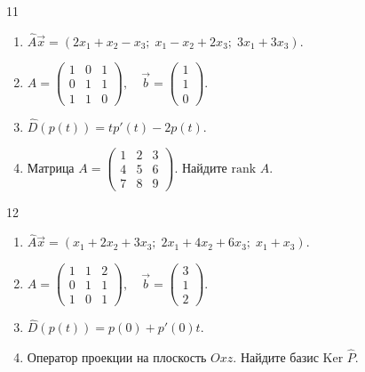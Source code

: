 \documentclass[12pt,a4paper]{article}
\theoremstyle{plain}
\theoremstyle{definition}
\begin{document}
\begin{taskbox}{11}
    \begin{enumerate}
        \item $\hat{A}\vec{x} = (2x_1 + x_2 - x_3; \; x_1 - x_2 + 2x_3; \; 3x_1 + 3x_3)$.
        \item $A = \begin{pmatrix} 1 & 0 & 1 \\ 0 & 1 & 1 \\ 1 & 1 & 0 \end{pmatrix}, \quad \vec{b} = \begin{pmatrix} 1 \\ 1 \\ 0 \end{pmatrix}$.
        \item $\hat{D}(p(t)) = t p'(t) - 2p(t)$.
        \item Матрица $A = \begin{pmatrix} 1 & 2 & 3 \\ 4 & 5 & 6 \\ 7 & 8 & 9 \end{pmatrix}$. Найдите $\text{rank } A$.
    \end{enumerate}
\end{taskbox}

\begin{taskbox}{12}
    \begin{enumerate}
        \item $\hat{A}\vec{x} = (x_1 + 2x_2 + 3x_3; \; 2x_1 + 4x_2 + 6x_3; \; x_1 + x_3)$.
        \item $A = \begin{pmatrix} 1 & 1 & 2 \\ 0 & 1 & 1 \\ 1 & 0 & 1 \end{pmatrix}, \quad \vec{b} = \begin{pmatrix} 3 \\ 1 \\ 2 \end{pmatrix}$.
        \item $\hat{D}(p(t)) = p(0) + p'(0)t$.
        \item Оператор проекции на плоскость $Oxz$. Найдите базис $\text{Ker } \hat{P}$.
    \end{enumerate}
\end{taskbox}
\end{document}
